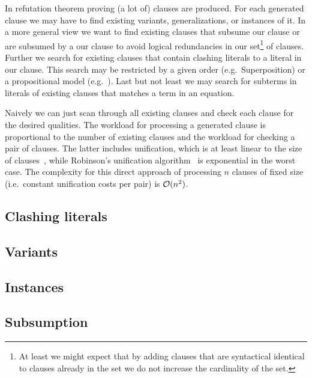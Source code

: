 


In refutation theorem proving (a lot of) clauses are produced.
For each generated clause we may have to find
existing variants, generalizations, or instances of it.
In a more general view we want to find existing clauses
that subsume our clause or are subsumed by a our clause
to avoid logical redundancies in our set\footnote{
	At least we might expect that by adding clauses
	that are syntactical identical to clauses already in the set
	we do not increase the cardinality of the set.
} of clauses.
Further we search for existing clauses that contain clashing literals to a literal in our clause.
This search may be restricted by a given order (e.g.~Superposition) or a propositional model (e.g.~\InstGenEQ).
Last but not least we may search for subterms in literals of existing clauses that matches a term in an equation.

Naively we can just scan through all existing clauses and check each clause for the desired qualities.
	The workload for processing a generated clause is proportional to the number of existing clauses and
	the workload for checking a pair of clauses.
	The latter includes unification, which is at least linear to the size of clauses~\cite{ALBERT19933},
	while Robinson's unification algorithm~\cite{Robinson:1965:MLB:321250.321253} is exponential in the worst case.
	The complexity for this direct approach of processing \( n \) clauses of fixed size (i.e.~constant unification costs per pair) is \( \mathcal{O}(n^2) \).









\subsection{Clashing literals}

\subsection{Variants}

\subsection{Instances}

\subsection{Subsumption}



